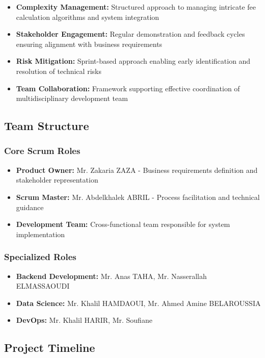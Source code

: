 \begin{itemize}
    \item \textbf{Complexity Management:} Structured approach to managing intricate fee calculation algorithms and system integration
    \item \textbf{Stakeholder Engagement:} Regular demonstration and feedback cycles ensuring alignment with business requirements
    \item \textbf{Risk Mitigation:} Sprint-based approach enabling early identification and resolution of technical risks
    \item \textbf{Team Collaboration:} Framework supporting effective coordination of multidisciplinary development team
\end{itemize}

\subsection{Team Structure}

\subsubsection{Core Scrum Roles}
\begin{itemize}
    \item \textbf{Product Owner:} Mr. Zakaria ZAZA - Business requirements definition and stakeholder representation
    \item \textbf{Scrum Master:} Mr. Abdelkhalek ABRIL - Process facilitation and technical guidance
    \item \textbf{Development Team:} Cross-functional team responsible for system implementation
\end{itemize}

\subsubsection{Specialized Roles}
\begin{itemize}
    \item \textbf{Backend Development:} Mr. Anas TAHA, Mr. Nasserallah ELMASSAOUDI
    \item \textbf{Data Science:} Mr. Khalil HAMDAOUI, Mr. Ahmed Amine BELAROUSSIA
    \item \textbf{DevOps:} Mr. Khalil HARIR, Mr. Soufiane
\end{itemize}

\subsection{Project Timeline}

